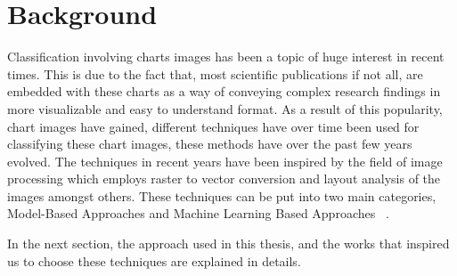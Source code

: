 \documentclass[12pt, a4paper,oneside]{report}
\begin{document}
\section{Background}
Classification involving charts images has been a topic of huge interest in recent times. This is due to the fact that, most scientific publications if not all, are embedded with these charts as a way of conveying complex research findings in more visualizable and easy to understand format. As a result of this popularity, chart images have gained, different techniques have over time been used for classifying these chart images, these methods have over the past few years evolved. The techniques in recent years have been inspired by the field of image processing which employs raster to vector conversion and layout analysis of the images amongst others. These techniques can be put into two main categories, Model-Based Approaches and Machine Learning Based Approaches ~\cite{amara2017convolutional}. 

In the next section, the approach used in this thesis, and the works that inspired us to choose these techniques are explained in details.
\end{document}
